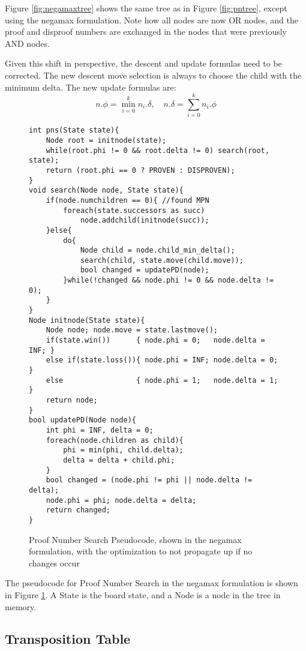 Figure \ref{fig:negamaxtree} shows the same tree as in Figure \ref{fig:pntree}, except using the negamax formulation. Note how all nodes are now OR nodes, and the proof and disproof numbers are exchanged in the nodes that were previously AND nodes.

Given this shift in perspective, the descent and update formulas need to be corrected. The new descent move selection is always to choose the child with the minimum delta. The new update formulas are: $$ n.\phi = \displaystyle\min\limits_{i=0}^k n_i.\delta, \quad n.\delta = \displaystyle\sum\limits_{i=0}^k n_i.\phi $$

\begin{figure}

\begin{lstlisting}
int pns(State state){
	Node root = initnode(state);
	while(root.phi != 0 && root.delta != 0) search(root, state);
	return (root.phi == 0 ? PROVEN : DISPROVEN);
}
void search(Node node, State state){
	if(node.numchildren == 0){ //found MPN
		foreach(state.successors as succ)
			node.addchild(initnode(succ));
	}else{
		do{
			Node child = node.child_min_delta();
			search(child, state.move(child.move));
			bool changed = updatePD(node);
		}while(!changed && node.phi != 0 && node.delta != 0);
	}
}
Node initnode(State state){
	Node node; node.move = state.lastmove();
	if(state.win())      { node.phi = 0;   node.delta = INF; }
	else if(state.loss()){ node.phi = INF; node.delta = 0;   }
	else                 { node.phi = 1;   node.delta = 1;   }
	return node;
}
bool updatePD(Node node){
	int phi = INF, delta = 0;
	foreach(node.children as child){
		phi = min(phi, child.delta);
		delta = delta + child.phi;
	}
	bool changed = (node.phi != phi || node.delta != delta);
	node.phi = phi; node.delta = delta;
	return changed;
}
\end{lstlisting}

\caption[Proof Number Search Pseudocode]{Proof Number Search Pseudocode, shown in the negamax formulation, with the optimization to not propagate up if no changes occur}
\label{fig:pnscode}
\end{figure}

The pseudocode for Proof Number Search in the negamax formulation is shown in Figure \ref{fig:pnscode}. A State is the board state, and a Node is a node in the tree in memory.


\subsection{Transposition Table}


